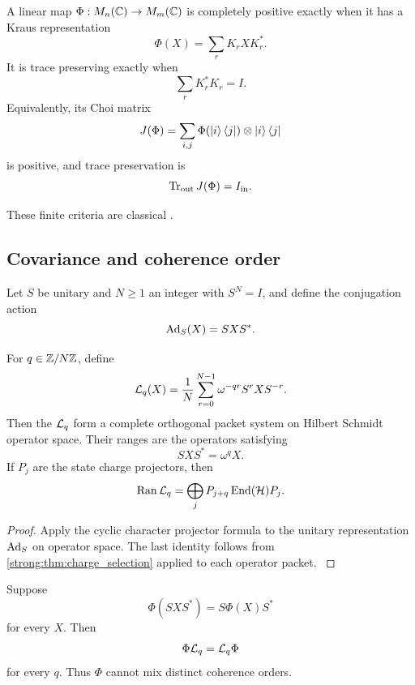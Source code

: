 \begin{standardfact}\label{strong:standardfact:001}\label{strong:fact:kraus_choi}
A linear map \(\Phi:M_n(\mathbb C)\to M_m(\mathbb C)\) is completely positive exactly when it has a Kraus representation
\[
\Phi(X)=\sum_rK_rXK_r^*.
\]
It is trace preserving exactly when
\[
\sum_rK_r^*K_r=I.
\]
Equivalently, its Choi matrix
\[
J(\Phi)
=
\sum_{i,j}\Phi(\left|i\right\rangle\left\langle j\right|)\otimes\left|i\right\rangle\left\langle j\right|
\]
is positive, and trace preservation is
\[
\operatorname{Tr}_{\rm out}J(\Phi)=I_{\rm in}.
\]
\end{standardfact}

These finite criteria are classical \cite{Stinespring1955,Choi1975,Kraus1983,Watrous2018}.

\subsection{Covariance and coherence order}\label{strong:subsec:channel_covariance}

Let \(S\) be unitary and \(N\ge1\) an integer with \(S^N=I\), and define the conjugation action
\[
\operatorname{Ad}_S(X)=SXS^*.
\]

\begin{theorem}\label{strong:theorem:022}\label{strong:thm:coherence_projectors}
For \(q\in\mathbb Z/N\mathbb Z\), define
\[
\mathcal L_q(X)
=
\frac1N
\sum_{r=0}^{N-1}
\omega^{-qr}S^rXS^{-r}.
\]
Then the \(\mathcal L_q\) form a complete orthogonal packet system on Hilbert Schmidt operator space. Their ranges are the operators satisfying
\[
SXS^*=\omega^qX.
\]
If \(P_j\) are the state charge projectors, then
\[
\operatorname{Ran}\mathcal L_q
=
\bigoplus_jP_{j+q}\operatorname{End}(\mathcal H)P_j.
\]
\end{theorem}

\begin{proof}\label{strong:proof:033}
Apply the cyclic character projector formula to the unitary representation \(\operatorname{Ad}_S\) on operator space. The last identity follows from \cref{strong:thm:charge_selection} applied to each operator packet.
\label{strong:proof:033:end}\end{proof}

\begin{theorem}\label{strong:theorem:023}\label{strong:thm:covariant_channel}
Suppose
\[
\Phi(SXS^*)=S\Phi(X)S^*
\]
for every \(X\). Then
\[
\Phi\mathcal L_q=\mathcal L_q\Phi
\]
for every \(q\). Thus \(\Phi\) cannot mix distinct coherence orders.
\end{theorem}


